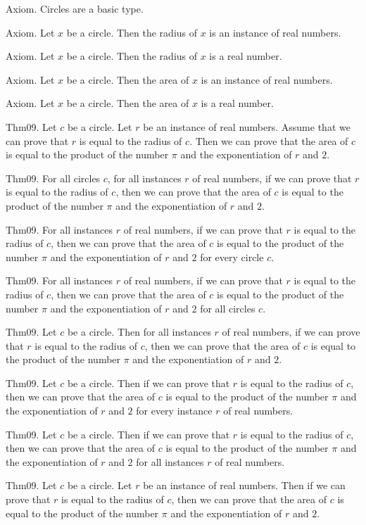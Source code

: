 \documentclass{article}
\begin{document}
Axiom. Circles are a basic type.

Axiom. Let $x$ be a circle. Then the radius of $x$ is an instance of real numbers.

Axiom. Let $x$ be a circle. Then the radius of $x$ is a real number.

Axiom. Let $x$ be a circle. Then the area of $x$ is an instance of real numbers.

Axiom. Let $x$ be a circle. Then the area of $x$ is a real number.

Thm09. Let $c$ be a circle. Let $r$ be an instance of real numbers. Assume that we can prove that $r$ is equal to the radius of $c$. Then we can prove that the area of $c$ is equal to the product of the number \(\pi\) and the exponentiation of $r$ and $2$.

Thm09. For all circles $c$, for all instances $r$ of real numbers, if we can prove that $r$ is equal to the radius of $c$, then we can prove that the area of $c$ is equal to the product of the number \(\pi\) and the exponentiation of $r$ and $2$.

Thm09. For all instances $r$ of real numbers, if we can prove that $r$ is equal to the radius of $c$, then we can prove that the area of $c$ is equal to the product of the number \(\pi\) and the exponentiation of $r$ and $2$ for every circle $c$.

Thm09. For all instances $r$ of real numbers, if we can prove that $r$ is equal to the radius of $c$, then we can prove that the area of $c$ is equal to the product of the number \(\pi\) and the exponentiation of $r$ and $2$ for all circles $c$.

Thm09. Let $c$ be a circle. Then for all instances $r$ of real numbers, if we can prove that $r$ is equal to the radius of $c$, then we can prove that the area of $c$ is equal to the product of the number \(\pi\) and the exponentiation of $r$ and $2$.

Thm09. Let $c$ be a circle. Then if we can prove that $r$ is equal to the radius of $c$, then we can prove that the area of $c$ is equal to the product of the number \(\pi\) and the exponentiation of $r$ and $2$ for every instance $r$ of real numbers.

Thm09. Let $c$ be a circle. Then if we can prove that $r$ is equal to the radius of $c$, then we can prove that the area of $c$ is equal to the product of the number \(\pi\) and the exponentiation of $r$ and $2$ for all instances $r$ of real numbers.

Thm09. Let $c$ be a circle. Let $r$ be an instance of real numbers. Then if we can prove that $r$ is equal to the radius of $c$, then we can prove that the area of $c$ is equal to the product of the number \(\pi\) and the exponentiation of $r$ and $2$.
\end{document}
